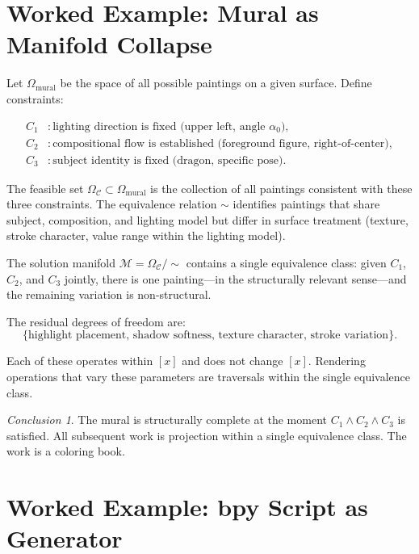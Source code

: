 \documentclass[11pt, twoside]{article}
\theoremstyle{plain}
\theoremstyle{definition}
\theoremstyle{remark}
\newtheorem{conclusion}[theorem]{Conclusion}
\newcommand{\OmC}{\Omega_{\mathcal{C}}}
\begin{document}
\section{Worked Example: Mural as Manifold Collapse}
\label{app:mural}

Let $\Omega_{\text{mural}}$ be the space of all possible paintings on a given surface. Define constraints:

\begin{align*}
C_1 &: \text{lighting direction is fixed (upper left, angle } \alpha_0\text{)}, \\
C_2 &: \text{compositional flow is established (foreground figure, right-of-center)}, \\
C_3 &: \text{subject identity is fixed (dragon, specific pose)}.
\end{align*}

The feasible set $\OmC \subset \Omega_{\text{mural}}$ is the collection of all paintings consistent with these three constraints. The equivalence relation $\sim$ identifies paintings that share subject, composition, and lighting model but differ in surface treatment (texture, stroke character, value range within the lighting model).

The solution manifold $\mathcal{M} = \OmC / {\sim}$ contains a single equivalence class: given $C_1$, $C_2$, and $C_3$ jointly, there is one painting---in the structurally relevant sense---and the remaining variation is non-structural.

The residual degrees of freedom are:
\[
\{ \text{highlight placement, shadow softness, texture character, stroke variation} \}.
\]

Each of these operates within $[x]$ and does not change $[x]$. Rendering operations that vary these parameters are traversals within the single equivalence class.

\begin{conclusion}
The mural is structurally complete at the moment $C_1 \wedge C_2 \wedge C_3$ is satisfied. All subsequent work is projection within a single equivalence class. The work is a coloring book.
\end{conclusion}

\section{Worked Example: bpy Script as Generator}
\label{app:bpy}
\end{document}
